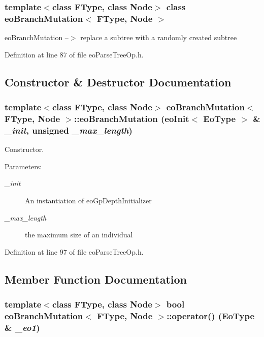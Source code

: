 \subsubsection*{template$<$class FType, class Node$>$ class eo\-Branch\-Mutation$<$ FType, Node $>$}

eo\-Branch\-Mutation --$>$ replace a subtree with a randomly created subtree 



Definition at line 87 of file eo\-Parse\-Tree\-Op.h.

\subsection{Constructor \& Destructor Documentation}
\subsubsection{\setlength{\rightskip}{0pt plus 5cm}template$<$class FType, class Node$>$ {\bf eo\-Branch\-Mutation}$<$ FType, Node $>$::{\bf eo\-Branch\-Mutation} ({\bf eo\-Init}$<$ {\bf Eo\-Type} $>$ \& {\em \_\-init}, unsigned {\em \_\-max\_\-length})\hspace{0.3cm}{\tt  [inline]}}\label{classeo_branch_mutation_a0}


Constructor. 

\begin{Desc}
\item[Parameters:]
\begin{description}
\item[{\em \_\-init}]An instantiation of eo\-Gp\-Depth\-Initializer \item[{\em \_\-max\_\-length}]the maximum size of an individual \end{description}
\end{Desc}


Definition at line 97 of file eo\-Parse\-Tree\-Op.h.

\subsection{Member Function Documentation}
\subsubsection{\setlength{\rightskip}{0pt plus 5cm}template$<$class FType, class Node$>$ bool {\bf eo\-Branch\-Mutation}$<$ FType, Node $>$::operator() ({\bf Eo\-Type} \& {\em \_\-eo1})\hspace{0.3cm}{\tt  [inline]}}\label{classeo_branch_mutation_a3}


